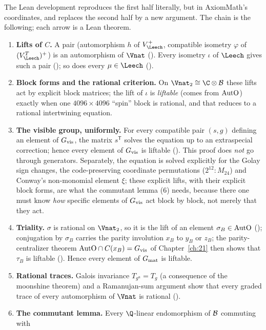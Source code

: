 The Lean development reproduces the first half literally, but in AxiomMath's coordinates, and replaces the
second half by a new argument.  The chain is the following; each arrow is a Lean theorem.
\begin{enumerate}[label=(\arabic*)]
\item \textbf{Lifts of $C$.}  A pair (automorphism $h$ of $V_\Leech^+$, compatible isometry $\varphi$ of
  $(V_\Leech^T)^+$) is an automorphism of $\Vnat$ ().  Every isometry $\iota$ of $\Leech$ gives
  such a pair (); so does every $\mu\in\Leech$ ().
\item \textbf{Block forms and the rational criterion.}  On $\Vnat_2\cong\C\otimes\chtwentytwoB$ these lifts act by
  explicit block matrices; the lift of $\iota$ is \emph{liftable} (comes from $\mathrm{AutO}$) exactly when one
  $4096\times4096$ ``spin'' block is rational, and that reduces to a rational intertwining equation.
\item \textbf{The visible group, uniformly.}  For every compatible pair $(s,g)$ defining an element of
  $G_{\mathrm{vis}}$, the matrix $s^{\mathsf T}$ solves the equation up to an extraspecial correction; hence every element
  of $G_{\mathrm{vis}}$ is liftable ().  This proof does \emph{not} go through generators.
  Separately, the equation is solved explicitly for the Golay sign changes, the code-preserving coordinate permutations
  ($2^{12}{:}M_{24}$) and Conway's non-monomial element $\xi$; these explicit lifts, with their explicit block forms, are
  what the commutant lemma (6) needs, because there one must know \emph{how} specific elements of $G_{\mathrm{vis}}$ act
  block by block, not merely that they act.
\item \textbf{Triality.}  $\sigma$ is rational on $\Vnat_2$, so it is the lift of an element $\sigma_B\in\mathrm{AutO}$
  (); conjugation by $\sigma_B$ carries the parity involution $x_B$ to $y_B$ or $z_B$; the
  parity-centralizer theorem $\mathrm{AutO}\cap C(x_B)=G_{\mathrm{vis}}$ of Chapter~\ref{ch:21} then shows that
  $\tau_B$ is liftable ().  Hence every element of $G_{\mathrm{mat}}$ is liftable.
\item \textbf{Rational traces.}  Galois invariance $T_{g^u}=T_g$ (a consequence of the moonshine theorem) and a
  Ramanujan-sum argument show that every graded trace of every automorphism of $\Vnat$ is rational
  ().
\item \textbf{The commutant lemma.}  Every $\Q$-linear endomorphism of $\mathcal{B}$ commuting with

\end{enumerate}
